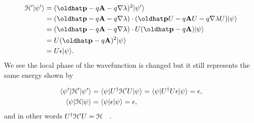 \begin{align}
  \ham' |\psi'\rangle &= (\hat{p} - q \vec{A} - q \nabla \lambda)^2 |\psi'\rangle \nonumber \\
  &= (\hat{p} - q \vec{A} - q \nabla \lambda) \cdot (\hat{p} U - q \vec{A} U - q \nabla \lambda U) |\psi\rangle \nonumber \\
  &= (\hat{p} - q \vec{A} - q \nabla \lambda) \cdot U (\hat{p} - q \vec{A}) |\psi\rangle \nonumber \\
  &= U (\hat{p} - q \vec{A})^2 |\psi\rangle \nonumber \\
  &= U \epsilon |\psi\rangle.
\end{align}
We see the local phase of the wavefunction is changed but it still represents the same energy shown by

\begin{align}
  \langle \psi'| \mathcal{H}' |\psi'\rangle &= \langle \psi | U^{\dagger} \mathcal{H}' U |\psi \rangle = \langle \psi | U^{\dagger} U \epsilon |\psi \rangle = \epsilon, \nonumber \\
  \langle \psi | \mathcal{H} |\psi \rangle &= \langle \psi | \epsilon |\psi \rangle = \epsilon, \end{align}
and in other words
$U^{\dagger} \mathcal{H}' U = \mathcal{H}$  ~\cite{kittelIntroductionSolidState2018}.
